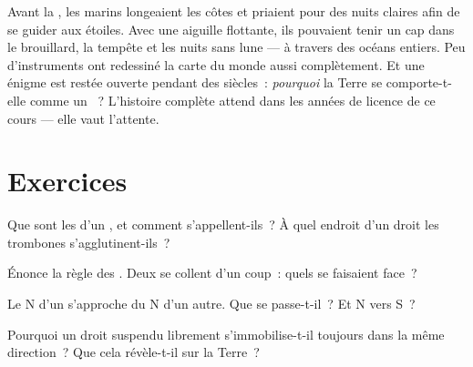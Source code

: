 \begin{remark}\label{rem:g4:magnets-and-compass:history}
Avant la , les marins longeaient les côtes et priaient pour
des nuits claires afin de se guider aux étoiles. Avec une aiguille
flottante, ils pouvaient tenir un cap dans le brouillard, la tempête
et les nuits sans lune --- à travers des océans entiers. Peu
d'instruments ont redessiné la carte du monde aussi complètement. Et
une énigme est restée ouverte pendant des siècles~: \emph{pourquoi}
la Terre se comporte-t-elle comme un ~? L'histoire complète
attend dans les années de licence de ce cours --- elle vaut
l'attente.
\end{remark}

\section{Exercices}

\begin{exercise}[$\star$]\label{exo:g4:magnets-and-compass:1}
Que sont les  d'un , et comment s'appellent-ils~? À quel
endroit d'un  droit les trombones s'agglutinent-ils~?
\end{exercise}

\begin{exercise}[$\star$]\label{exo:g4:magnets-and-compass:2}
Énonce la règle des . Deux  se collent d'un coup~: quels
 se faisaient face~?
\end{exercise}

\begin{exercise}[$\star$]\label{exo:g4:magnets-and-compass:3}
Le  N d'un  s'approche du  N d'un autre. Que se
passe-t-il~? Et N vers S~?
\end{exercise}

\begin{exercise}[$\star$]\label{exo:g4:magnets-and-compass:4}
Pourquoi un  droit suspendu librement s'immobilise-t-il
toujours dans la même direction~? Que cela révèle-t-il sur la Terre~?
\end{exercise}

